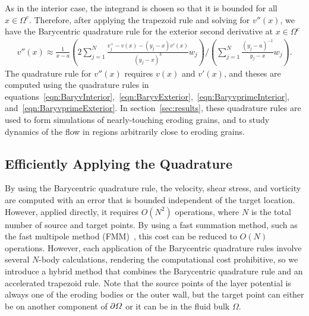 \documentclass{jfm}
\begin{document}
As in the interior case, the integrand is chosen so that it is bounded
for all $x \in \Omega^c$.  Therefore, after applying the trapezoid rule
and solving for $v''(x)$, we have the Barycentric quadrature rule for
the exterior second derivative at $x \in \Omega^c$
\begin{align}
  v''(x) \approx \frac{1}{x-a}\left(2\sum\limits_{j=1}^N
    \frac{v^{+}_{j} - v(x) - (y_j-x)v'(x)}{(y_j-x)^3}w_j\right)
    \Bigg/
    \left(\sum_{j=1}^N \frac{(y_j-a)^{-1}}{y_j-x}w_j\right).
\end{align}
The quadrature rule for $v''(x)$ requires $v(x)$ and $v'(x)$, and theses
are computed using the quadrature rules in
equations~\eqref{eqn:BaryvInterior},~\eqref{eqn:BaryvExterior},~\eqref{eqn:BaryvprimeInterior},
and~\eqref{eqn:BaryvprimeExterior}. In section~\ref{sec:results}, these
quadrature rules are used to form simulations of nearly-touching eroding
grains, and to study dynamics of the flow in regions arbitrarily close
to eroding grains.

\subsection{Efficiently Applying the Quadrature}
\label{sec:fmm}
By using the Barycentric quadrature rule, the velocity, shear stress,
and vorticity are computed with an error that is bounded independent of
the target location. However, applied directly, it requires
$O(N^2)$ operations, where $N$ is the total number of source
and target points.  By using a fast summation method, such as the fast
multipole method (FMM)~\citep{gre-rok1987}, this cost can be reduced to
$O(N)$ operations.  However, each application of the Barycentric
quadrature rules involve several $N$-body calculations, rendering the
computational cost prohibitive, so we introduce a hybrid method that
combines the Barycentric quadrature rule and an accelerated trapezoid
rule.  Note that the source points of the layer potential is always one
of the eroding bodies or the outer wall, but the target point can either
be on another component of ${\partial}\varOmega$ or it can be in the fluid bulk
$\Omega$.
\end{document}
